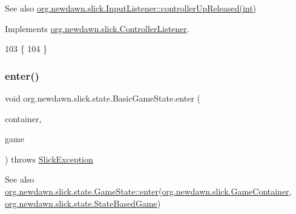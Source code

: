 \begin{DoxySeeAlso}{See also}
\mbox{\hyperlink{interfaceorg_1_1newdawn_1_1slick_1_1_controller_listener_a1342ad9ad1f7314b4eb10c20c21a9d50}{org.\+newdawn.\+slick.\+Input\+Listener\+::controller\+Up\+Released(int)}} 
\end{DoxySeeAlso}


Implements \mbox{\hyperlink{interfaceorg_1_1newdawn_1_1slick_1_1_controller_listener_a1342ad9ad1f7314b4eb10c20c21a9d50}{org.\+newdawn.\+slick.\+Controller\+Listener}}.


\begin{DoxyCode}
103                                                      \{
104     \}
\end{DoxyCode}
\mbox{\label{classorg_1_1newdawn_1_1slick_1_1state_1_1_basic_game_state_a911b009b86365da17fa6c1814ba2e1b4}} 
\subsubsection{\texorpdfstring{enter()}{enter()}}
{\footnotesize\ttfamily void org.\+newdawn.\+slick.\+state.\+Basic\+Game\+State.\+enter (\begin{DoxyParamCaption}\item[{\mbox{\hyperlink{classorg_1_1newdawn_1_1slick_1_1_game_container}{Game\+Container}}}]{container,  }\item[{\mbox{\hyperlink{classorg_1_1newdawn_1_1slick_1_1state_1_1_state_based_game}{State\+Based\+Game}}}]{game }\end{DoxyParamCaption}) throws \mbox{\hyperlink{classorg_1_1newdawn_1_1slick_1_1_slick_exception}{Slick\+Exception}}\hspace{0.3cm}{\ttfamily [inline]}}

\begin{DoxySeeAlso}{See also}
\mbox{\hyperlink{interfaceorg_1_1newdawn_1_1slick_1_1state_1_1_game_state_ad5fc28eca9bed5ca50fffa9adf138884}{org.\+newdawn.\+slick.\+state.\+Game\+State\+::enter}}(\mbox{\hyperlink{classorg_1_1newdawn_1_1slick_1_1_game_container}{org.\+newdawn.\+slick.\+Game\+Container}}, \mbox{\hyperlink{classorg_1_1newdawn_1_1slick_1_1state_1_1_state_based_game}{org.\+newdawn.\+slick.\+state.\+State\+Based\+Game}}) 
\end{DoxySeeAlso}


